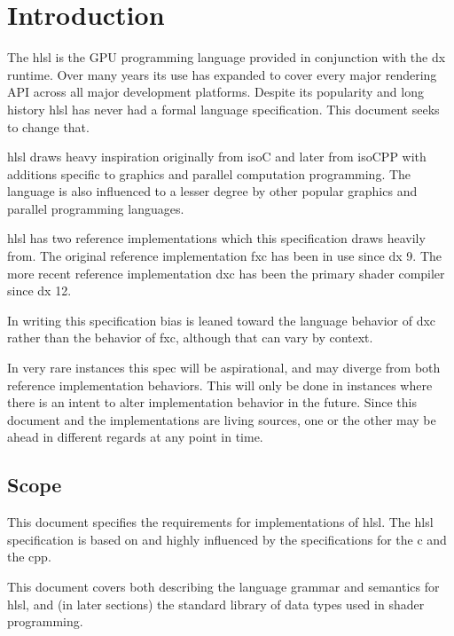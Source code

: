 \chapter{Introduction} \label{ch:Intro}

\p The \acrfull{hlsl} is the GPU programming language provided in conjunction
with the \gls{dx} runtime. Over many years its use has expanded to cover every
major rendering API across all major development platforms. Despite its
popularity and long history \acrshort{hlsl} has never had a formal language
specification. This document seeks to change that.

\p \acrshort{hlsl} draws heavy inspiration originally from \gls{isoC} and later
from \gls{isoCPP} with additions specific to graphics and parallel computation
programming. The language is also influenced to a lesser degree by other popular
graphics and parallel programming languages.

\p \acrshort{hlsl} has two reference implementations which this specification
draws heavily from. The original reference implementation \acrfull{fxc} has been
in use since \gls{dx} 9. The more recent reference implementation \acrfull{dxc}
has been the primary shader compiler since \gls{dx} 12.

\p In writing this specification bias is leaned toward the language
behavior of \acrshort{dxc} rather than the behavior of \acrshort{fxc}, although
that can vary by context.

\p In very rare instances this spec will be aspirational, and may diverge from
both reference implementation behaviors. This will only be done in instances
where there is an intent to alter implementation behavior in the future. Since
this document and the implementations are living sources, one or the other may
be ahead in different regards at any point in time.

\section{Scope} \label{sec:Scope}

\p This document specifies the requirements for implementations of
\acrshort{hlsl}. The \acrshort{hlsl} specification is based on and highly
influenced by the specifications for the \acrfull{c} and the \acrfull{cpp}.

\p This document covers both describing the language grammar and semantics for
\acrshort{hlsl}, and (in later sections) the standard library of data types used
in shader programming.

